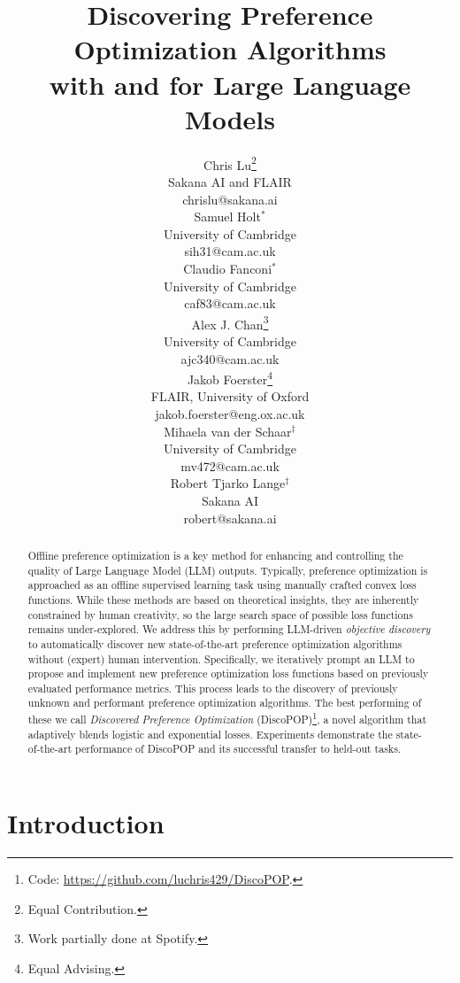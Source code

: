 \documentclass{article}
\title{Discovering Preference Optimization Algorithms \\ with and for Large Language Models}
\author{
  Chris Lu\thanks{Equal Contribution.} \\
  Sakana AI and FLAIR \\
  chrislu@sakana.ai \\
\And
  Samuel Holt$^{*}$ \\
  University of Cambridge \\
  sih31@cam.ac.uk \\
\And
  Claudio Fanconi$^{*}$ \\
  University of Cambridge \\
  caf83@cam.ac.uk \\
\AND
  Alex J. Chan\thanks{Work partially done at Spotify.} \\
  University of Cambridge \\
  ajc340@cam.ac.uk \\
\And
  Jakob Foerster\thanks{Equal Advising.} \\ 
  FLAIR, University of Oxford \\
  jakob.foerster@eng.ox.ac.uk \\
\And
  Mihaela van der Schaar$^{\ddagger}$ \\
  University of Cambridge \\
  mv472@cam.ac.uk \\
\And
  Robert Tjarko Lange$^{\ddagger}$\\
  Sakana AI \\
  robert@sakana.ai \\
}
\theoremstyle{plain}
\theoremstyle{definition}
\theoremstyle{remark}
\begin{document}
\doparttoc
\faketableofcontents


\maketitle

\setcounter{footnote}{0}
\begin{abstract}
Offline preference optimization is a key method for enhancing and controlling the quality of Large Language Model (LLM) outputs.
Typically, preference optimization is approached as an offline supervised learning task using manually crafted convex loss functions. While these methods are based on theoretical insights, they are inherently constrained by human creativity, so the large search space of possible loss functions remains under-explored.
We address this by performing LLM-driven \textit{objective discovery} to automatically discover new state-of-the-art preference optimization algorithms without (expert) human intervention.
Specifically, we iteratively prompt an LLM to propose and implement new preference optimization loss functions based on previously evaluated performance metrics. This process leads to the discovery of previously unknown and performant preference optimization algorithms.
The best performing of these we call \textit{Discovered Preference Optimization} (DiscoPOP)\footnote{Code: \url{https://github.com/luchris429/DiscoPOP}.}, a novel algorithm that adaptively blends logistic and exponential losses. Experiments demonstrate the state-of-the-art performance of DiscoPOP and its successful transfer to held-out tasks. 
\end{abstract}

\section{Introduction}
\label{introduction}
\end{document}
